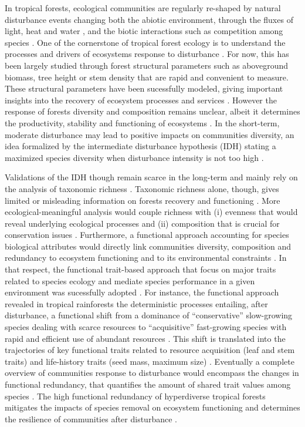 \documentclass[fleqn,10pt]{ArtEcoFoG} %
\begin{document}
In tropical forests, ecological communities are regularly re-shaped by
natural disturbance events changing both the abiotic environment,
through the fluxes of light, heat and water \citep{Goulamoussene2017},
and the biotic interactions such as competition among species
\citep{Chesson2000, Herault2018}. One of the cornerstone of tropical
forest ecology is to understand the processes and drivers of ecosystems
response to disturbance \citep{Chazdon2003a}. For now, this has been
largely studied through forest structural parameters such as aboveground
biomass, tree height or stem density
\citep{Piponiot2016, Rutishauser2016} that are rapid and convenient to
measure. These structural parameters have been sucessfully modeled,
giving important insights into the recovery of ecosystem processes and
services \citep{Herault2018}. However the response of forests diversity
and composition remains unclear, albeit it determines the productivity,
stability and functioning of ecosystems \citep{Tilman2014, Liang2016}.
In the short-term, moderate disturbance may lead to positive impacts on
communities diversity, an idea formalized by the intermediate
disturbance hypothesis (IDH) stating a maximized species diversity when
disturbance intensity is not too high \citep{Molino2001, Kariuki2006a}.

Validations of the IDH though remain scarce in the long-term and mainly
rely on the analysis of taxonomic richness \citep{Molino2001}. Taxonomic
richness alone, though, gives limited or misleading information on
forests recovery and functioning \citep{Chaudhary2016}. More
ecological-meaningful analysis would couple richness with (i) evenness
that would reveal underlying ecological processes and (ii) composition
that is crucial for conservation issues
\citep{Lavorel2002, Bellwood2006}. Furthermore, a functional approach
accounting for species biological attributes would directly link
communities diversity, composition and redundancy to ecosystem
functioning and to its environmental constraints
\citep{Violle2007b, Baraloto2012a}. In that respect, the functional
trait-based approach that focus on major traits related to species
ecology and mediate species performance in a given environment was
sucessfully adopted \citep{Diaz2005}. For instance, the functional
approach revealed in tropical rainforests the deterministic processes
entailing, after disturbance, a functional shift from a dominance of
``conservative'' slow-growing species dealing with scarce resources to
``acquisitive'' fast-growing species with rapid and efficient use of
abundant resources \citep{Reich2014, Herault2011}. This shift is
translated into the trajectories of key functional traits related to
resource acquisition (leaf and stem traits) and life-history traits
(seed mass, maximum size)
\citep{Wright2004, TerSteege2006, Westoby2006a, Chave2009b}. Eventually
a complete overview of communities response to disturbance would
encompass the changes in functional redundancy, that quantifies the
amount of shared trait values among species \citep{Carmona2016}. The
high functional redundancy of hyperdiverse tropical forests
\citep{Bellwood2006} mitigates the impacts of species removal on
ecosystem functioning and determines the resilience of communities after
disturbance \citep{Elmqvist2003, Diaz2005}.
\end{document}
